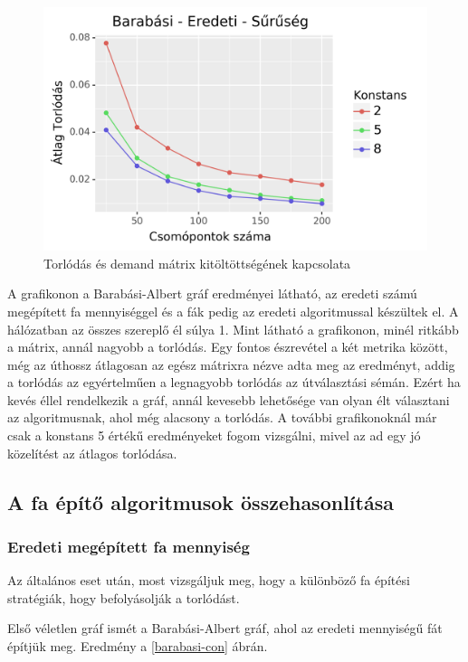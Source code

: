 \documentclass[12pt]{report}
\begin{document}
\begin{figure}[H]
	\begin{center}
		\includegraphics[width=0.9\linewidth]{pictures/density_con.png}
		\caption{Torlódás és demand mátrix kitöltöttségének kapcsolata }
		\label{density-con}
	\end{center}
\end{figure}

A grafikonon a Barabási-Albert gráf eredményei látható, az eredeti számú megépített fa mennyiséggel és a fák pedig az eredeti algoritmussal készültek el.
A hálózatban az összes szereplő él súlya 1.
Mint látható a grafikonon, minél ritkább a mátrix, annál nagyobb a torlódás. 
Egy fontos észrevétel a két metrika között, még az úthossz átlagosan az egész mátrixra nézve adta meg az eredményt, addig a torlódás az egyértelműen a legnagyobb torlódás az útválasztási sémán.
Ezért ha kevés éllel rendelkezik a gráf, annál kevesebb lehetősége van olyan élt választani az algoritmusnak, ahol még alacsony a torlódás.
A további grafikonoknál már csak a konstans 5 értékű eredményeket fogom vizsgálni, mivel az ad egy jó közelítést az átlagos torlódása.

\subsection{A fa építő algoritmusok összehasonlítása}

\subsubsection{Eredeti megépített fa mennyiség}

Az általános eset után, most vizsgáljuk meg, hogy a különböző fa építési stratégiák, hogy befolyásolják a torlódást.

Első véletlen gráf ismét a Barabási-Albert gráf, ahol az eredeti mennyiségű fát építjük meg. 
Eredmény a \ref{barabasi-con} ábrán.
\end{document}
